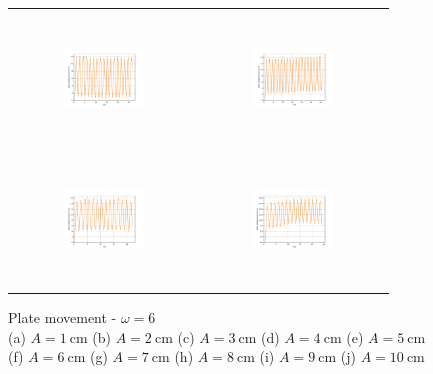 \begin{figure}[H]
\begin{center}
\begin{tabular}{cc}
\includegraphics[width=0.45\textwidth, height=3.5cm]{graph/omega=1.50_A=7_plate.pdf}
&
\includegraphics[width=0.45\textwidth, height=3.5cm]{graph/omega=1.50_A=8_plate.pdf}\\
\includegraphics[width=0.45\textwidth, height=3.5cm]{graph/omega=1.50_A=9_plate.pdf}
&
\includegraphics[width=0.45\textwidth, height=3.5cm]{graph/omega=1.50_A=10_plate.pdf}\\
\end{tabular}
\end{center}
\caption{Plate movement - $\omega=6$ \\ (a) $A=1\mathrm{~cm}$ (b) $A=2\mathrm{~cm}$ (c) $A=3\mathrm{~cm}$ (d) $A=4\mathrm{~cm}$ (e) $A=5\mathrm{~cm}$\\(f) $A=6\mathrm{~cm}$ (g) $A=7\mathrm{~cm}$ (h) $A=8\mathrm{~cm}$ (i) $A=9\mathrm{~cm}$ (j) $A=10\mathrm{~cm}$}
\label{Data_omega=6_plate}
\end{figure}

